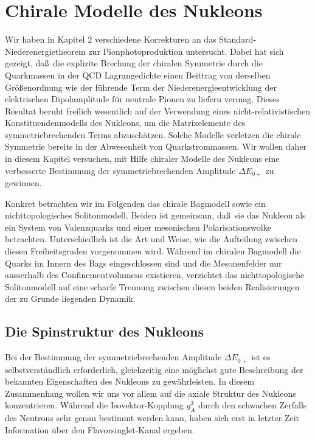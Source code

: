 \chapter{Chirale Modelle des Nukleons}
Wir haben in  Kapitel 2 verschiedene Korrekturen an das
Standard-Niederenergietheorem zur Pionphotoproduktion untersucht. 
Dabei hat sich gezeigt, da\ss\ die explizite Brechung der chiralen 
Symmetrie durch die Quarkmassen in der QCD Lagrangedichte einen
Beittrag von derselben Gr\"o\ss enordnung wie der f\"uhrende Term
der Niederenergieentwicklung der elektrischen Dipolamplitude
f\"ur neutrale Pionen zu liefern vermag.  Dieses Resultat beruht
freilich wesentlich auf der Verwendung eines nicht-relativistischen
Konstituendenmodells des Nukleons, um die Matrixelemente des 
symmetriebrechenden Terms abzusch\"atzen. Solche Modelle verletzen 
die chirale Symmetrie bereits in der Abwesenheit
von Quarkstrommassen. Wir wollen daher in diesem Kapitel versuchen,
mit Hilfe chiraler Modelle des Nukleons eine verbesserte Bestimmung
der symmetriebrechenden Amplitude $\Delta E_{0+}$ zu gewinnen.

Konkret betrachten wir im Folgenden das chirale Bagmodell sowie
ein nichttopologisches Solitonmodell. Beiden ist gemeinsam, da\ss\
sie das Nukleon als ein System von Valenzquarks und einer mesonischen
Polarisationswolke betrachten. Unterschiedlich ist die Art und Weise,
wie die Aufteilung zwischen diesen Freiheitsgraden vorgenommen wird.
W\"ahrend im chiralen Bagmodell die Quarks im Innern des 
Bags eingeschlossen sind und die Mesonenfelder nur ausserhalb des
Confinementvolumens existieren, verzichtet das nichttopologische
Solitonmodell auf eine scharfe Trennung zwischen diesen beiden 
Realisierungen der zu Grunde liegenden Dynamik.
  
  
\section{Die Spinstruktur des Nukleons}
Bei der Bestimmung der symmetriebrechenden Amplitude $\Delta E_{0+}$
ist es selbstverst\"andlich erforderlich, gleichzeitig eine
m\"oglichst gute Beschreibung der bekannten Eigenschaften des 
Nukleons zu gew\"ahrleisten. In diesem Zusammenhang wollen wir 
uns vor allem auf die axiale Struktur des Nukleons konzentrieren. 
W\"ahrend die Isovektor-Kopplung $g_A^3$ durch den schwachen Zerfalls
des Neutrons sehr genau bestimmt werden kann, haben sich erst 
in letzter Zeit Information \"uber den Flavorsinglet-Kanal ergeben.

